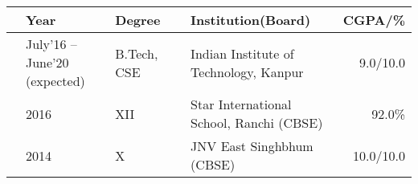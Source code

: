 
\newcommand{\education}[4]{
  & #1 & #2 & &#3 & #4
}
\begin{center}
\begin{tabular}{ | L{0.05cm} l | L{3cm} | L{0.05cm} C{7cm} | r |}
  \hline
  \education{\textbf{Year}}{\textbf{Degree}}{\textbf{Institution(Board)}}{\textbf{CGPA/\%}}\\
  \hline
  \education{July'16 -- June'20 (expected)}{B.Tech, CSE}{Indian Institute of Technology, Kanpur}{9.0/10.0}\\
  \education{2016}{XII}{Star International School, Ranchi (CBSE)}{92.0\%}\\
  \education{2014}{X}{JNV East Singhbhum (CBSE)}{10.0/10.0}\\
  \hline
\end{tabular}
\end{center}
\vspace{-4mm}

